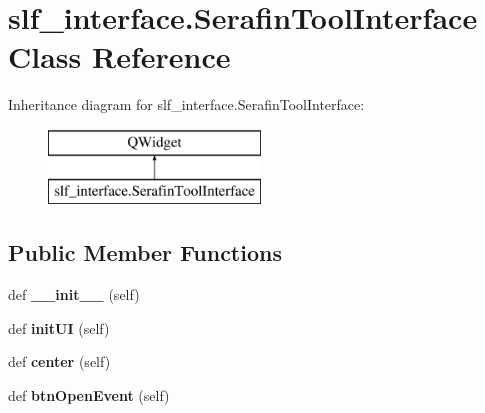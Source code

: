 \hypertarget{classslf__interface_1_1_serafin_tool_interface}{}\section{slf\+\_\+interface.\+Serafin\+Tool\+Interface Class Reference}
\label{classslf__interface_1_1_serafin_tool_interface}
Inheritance diagram for slf\+\_\+interface.\+Serafin\+Tool\+Interface\+:\begin{figure}[H]
\begin{center}
\leavevmode
\includegraphics[height=2.000000cm]{classslf__interface_1_1_serafin_tool_interface}
\end{center}
\end{figure}
\subsection*{Public Member Functions}
\begin{DoxyCompactItemize}
\item 
def {\bfseries \+\_\+\+\_\+init\+\_\+\+\_\+} (self)\hypertarget{classslf__interface_1_1_serafin_tool_interface_a495ccfb8ff3da19bce77d95441259d84}{}\label{classslf__interface_1_1_serafin_tool_interface_a495ccfb8ff3da19bce77d95441259d84}

\item 
def {\bfseries init\+UI} (self)\hypertarget{classslf__interface_1_1_serafin_tool_interface_ac995cc377417f3ee2972b8386363f8cc}{}\label{classslf__interface_1_1_serafin_tool_interface_ac995cc377417f3ee2972b8386363f8cc}

\item 
def {\bfseries center} (self)\hypertarget{classslf__interface_1_1_serafin_tool_interface_a61177569f9f495d6ff71aa6b056a8a5a}{}\label{classslf__interface_1_1_serafin_tool_interface_a61177569f9f495d6ff71aa6b056a8a5a}

\item 
def {\bfseries btn\+Open\+Event} (self)\hypertarget{classslf__interface_1_1_serafin_tool_interface_ad4f2d7e291824fd51ed68dd3a127356c}{}\label{classslf__interface_1_1_serafin_tool_interface_ad4f2d7e291824fd51ed68dd3a127356c}

\end{DoxyCompactItemize}
